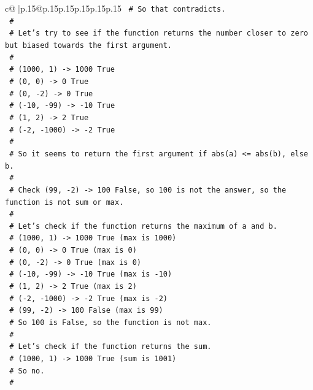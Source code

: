 \documentclass{article}
\begin{document}
{\begin{supertabular}{c@{$\;$}|p{.15\linewidth}@{}p{.15\linewidth}p{.15\linewidth}p{.15\linewidth}p{.15\linewidth}p{.15\linewidth}}
{{{\texttt{    \# So that contradicts.} \\
\texttt{    \#} \\
\texttt{    \# Let's try to see if the function returns the number closer to zero but biased towards the first argument.} \\
\texttt{    \#} \\
\texttt{    \# (1000, 1) {-}> 1000 True} \\
\texttt{    \# (0, 0) {-}> 0 True} \\
\texttt{    \# (0, {-}2) {-}> 0 True} \\
\texttt{    \# ({-}10, {-}99) {-}> {-}10 True} \\
\texttt{    \# (1, 2) {-}> 2 True} \\
\texttt{    \# ({-}2, {-}1000) {-}> {-}2 True} \\
\texttt{    \#} \\
\texttt{    \# So it seems to return the first argument if abs(a) <= abs(b), else b.} \\
\texttt{    \#} \\
\texttt{    \# Check (99, {-}2) {-}> 100 False, so 100 is not the answer, so the function is not sum or max.} \\
\texttt{    \#} \\
\texttt{    \# Let's check if the function returns the maximum of a and b.} \\
\texttt{    \# (1000, 1) {-}> 1000 True (max is 1000)} \\
\texttt{    \# (0, 0) {-}> 0 True (max is 0)} \\
\texttt{    \# (0, {-}2) {-}> 0 True (max is 0)} \\
\texttt{    \# ({-}10, {-}99) {-}> {-}10 True (max is {-}10)} \\
\texttt{    \# (1, 2) {-}> 2 True (max is 2)} \\
\texttt{    \# ({-}2, {-}1000) {-}> {-}2 True (max is {-}2)} \\
\texttt{    \# (99, {-}2) {-}> 100 False (max is 99)} \\
\texttt{    \# So 100 is False, so the function is not max.} \\
\texttt{    \#} \\
\texttt{    \# Let's check if the function returns the sum.} \\
\texttt{    \# (1000, 1) {-}> 1000 True (sum is 1001)} \\
\texttt{    \# So no.} \\
\texttt{    \#} \\
}}}
\end{supertabular}}
\end{document}
